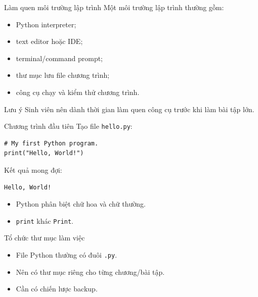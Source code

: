 \documentclass[aspectratio=169,10pt]{beamer}
\begin{document}
\begin{frame}{Làm quen môi trường lập trình}
Một môi trường lập trình thường gồm:
\begin{itemize}
  \item Python interpreter;
  \item text editor hoặc IDE;
  \item terminal/command prompt;
  \item thư mục lưu file chương trình;
  \item công cụ chạy và kiểm thử chương trình.
\end{itemize}

\begin{alertblock}{Lưu ý}
Sinh viên nên dành thời gian làm quen công cụ trước khi làm bài tập lớn.
\end{alertblock}
\end{frame}

\begin{frame}[fragile]{Chương trình đầu tiên}
Tạo file \texttt{hello.py}:

\begin{lstlisting}
# My first Python program.
print("Hello, World!")
\end{lstlisting}

Kết quả mong đợi:

\begin{lstlisting}
Hello, World!
\end{lstlisting}

\begin{itemize}
  \item Python phân biệt chữ hoa và chữ thường.
  \item \texttt{print} khác \texttt{Print}.
\end{itemize}
\end{frame}

\begin{frame}{Tổ chức thư mục làm việc}
\begin{center}
\end{center}

\begin{itemize}
  \item File Python thường có đuôi \texttt{.py}.
  \item Nên có thư mục riêng cho từng chương/bài tập.
  \item Cần có chiến lược backup.
\end{itemize}
\end{frame}
\end{document}
